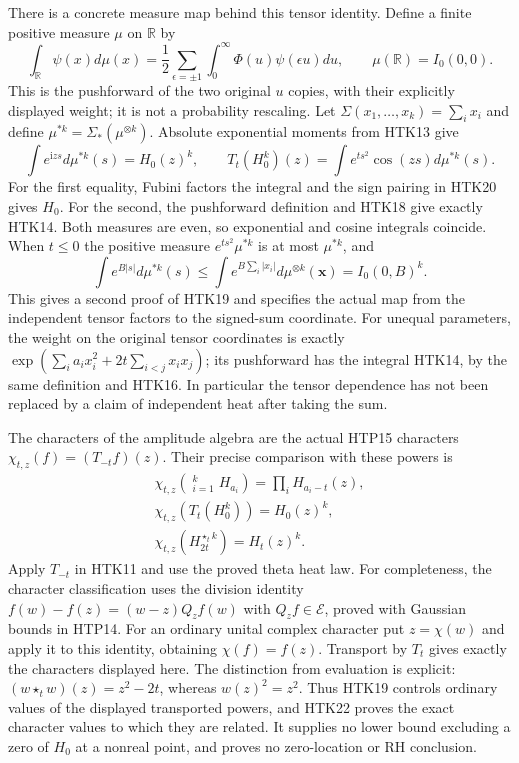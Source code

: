 There is a concrete measure map behind this tensor identity.
Define a finite positive measure $\mu$ on $\mathbb R$ by
\begin{equation}\tag{HTK20}
 \int_{\mathbb R}\psi(x)d\mu(x)
   =\frac12\sum_{\epsilon=\pm1}\int_0^\infty
                         \Phi(u)\psi(\epsilon u)du,
 \qquad \mu(\mathbb R)=I_0(0,0).
\end{equation}
This is the pushforward of the two original $u$ copies,
with their explicitly displayed weight; it is not a
probability rescaling. Let $\Sigma(x_1,\ldots,x_k)=\sum_i x_i$
and define $\mu^{*k}=\Sigma_*(\mu^{\otimes k})$.
Absolute exponential moments from HTK13 give
\begin{equation}\tag{HTK21}
 \int e^{\mathrm i z s}d\mu^{*k}(s)=H_0(z)^k,
 \qquad
 T_t(H_0^k)(z)=\int e^{ts^2}\cos(zs)d\mu^{*k}(s).
\end{equation}
For the first equality, Fubini factors the integral and
the sign pairing in HTK20 gives $H_0$. For the second,
the pushforward definition and HTK18 give exactly HTK14.
Both measures are even, so exponential and cosine integrals
coincide. When $t\le0$ the positive measure
$e^{ts^2}\mu^{*k}$ is at most $\mu^{*k}$, and
\[
 \int e^{B|s|}d\mu^{*k}(s)
 \le\int e^{B\sum_i|x_i|}d\mu^{\otimes k}(\mathbf x)
 =I_0(0,B)^k.
\]
This gives a second proof of HTK19 and specifies the actual
map from the independent tensor factors to the signed-sum
coordinate. For unequal parameters, the weight on the
original tensor coordinates is exactly
$\exp(\sum_i a_ix_i^2+2t\sum_{i<j}x_ix_j)$; its
pushforward has the integral HTK14, by the same definition
and HTK16. In particular the tensor dependence has not been
replaced by a claim of independent heat after taking the sum.

The characters of the amplitude algebra are the actual HTP15
characters $\chi_{t,z}(f)=(T_{-t}f)(z)$. Their precise
comparison with these powers is
\begin{equation}\tag{HTK22}
\begin{gathered}
 \chi_{t,z}\left(\mathop{\star_t}_{i=1}^kH_{a_i}\right)
                  =\prod_iH_{a_i-t}(z),\\
 \chi_{t,z}(T_t(H_0^k))=H_0(z)^k,\\
 \chi_{t,z}(H_{2t}^{\star_t k})=H_t(z)^k.
\end{gathered}
\end{equation}
Apply $T_{-t}$ in HTK11 and use the proved theta heat law.
For completeness, the character classification uses the
division identity
$f(w)-f(z)=(w-z)Q_zf(w)$ with $Q_zf\in\mathcal E$,
proved with Gaussian bounds in HTP14. For an ordinary
unital complex character put $z=\chi(w)$ and apply it to
this identity, obtaining $\chi(f)=f(z)$. Transport by
$T_t$ gives exactly the characters displayed here.
The distinction from evaluation is explicit:
$(w\star_tw)(z)=z^2-2t$, whereas $w(z)^2=z^2$.
Thus HTK19 controls ordinary values of the displayed
transported powers, and HTK22 proves the exact character
values to which they are related. It supplies no lower
bound excluding a zero of $H_0$ at a nonreal point, and
proves no zero-location or RH conclusion.

